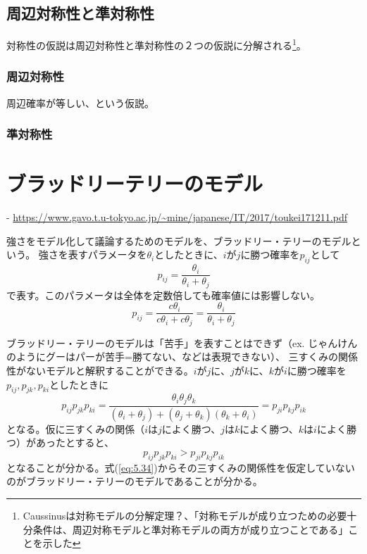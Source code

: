 \documentclass[10pt, a4paper]{ltjsarticle}
\newcommand\refeq[1]{式(\ref{#1})}
\begin{document}
\subsection{周辺対称性と準対称性}

対称性の仮説は周辺対称性と準対称性の２つの仮説に分解される\footnote{Caussinusは対称モデルの分解定理？、「対称モデルが成り立つための必要十分条件は、周辺対称モデルと準対称モデルの両方が成り立つことである」ことを示した}。

\subsubsection{周辺対称性}

周辺確率が等しい、という仮説。

\subsubsection{準対称性}

\newpage

\section{ブラッドリーテリーのモデル}

- \url{https://www.gavo.t.u-tokyo.ac.jp/~mine/japanese/IT/2017/toukei171211.pdf}

強さをモデル化して議論するためのモデルを、ブラッドリー・テリーのモデルという。
強さを表すパラメータを$\theta_i$としたときに、$i$が$j$に勝つ確率を$p_{ij}$として
\begin{equation}
  p_{ij} = \frac{\theta_i}{\theta_i + \theta_j}
\end{equation}
で表す。このパラメータは全体を定数倍しても確率値には影響しない。
\begin{equation}
  p_{ij} = \frac{c\theta_i}{c\theta_i + c\theta_j} =  \frac{\theta_i}{\theta_i + \theta_j}
\end{equation}

ブラッドリー・テリーのモデルは「苦手」を表すことはできず（ex. じゃんけんのようにグーはパーが苦手=勝てない、などは表現できない）、
三すくみの関係性がないモデルと解釈することができる。$i$が$j$に、$j$が$k$に、$k$が$i$に勝つ確率を$p_{ij}, p_{jk}, p_{ki}$としたときに
\begin{equation}
  p_{ij}p_{jk}p_{ki} = \frac{\theta_i\theta_j\theta_k}{(\theta_i + \theta_j)+(\theta_j+\theta_k)(\theta_k+\theta_i)} = p_{ji}p_{kj}p_{ik}
  \label{eq:5.34}
\end{equation}
となる。仮に三すくみの関係（$i$は$j$によく勝つ、$j$は$k$によく勝つ、$k$は$i$によく勝つ）があったとすると、
\begin{equation}
  p_{ij}p_{jk}p_{ki} > p_{ji}p_{kj}p_{ik}
\end{equation}
となることが分かる。\refeq{eq:5.34}からその三すくみの関係性を仮定していないのがブラッドリー・テリーのモデルであることが分かる。
\end{document}
